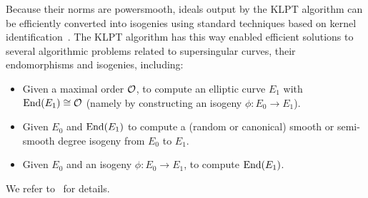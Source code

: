 Because their norms are powersmooth, ideals output by the KLPT algorithm can be efficiently converted into isogenies using standard techniques based on kernel identification~\cite{Waterhouse}. 
%
The KLPT algorithm has this way enabled efficient solutions to several algorithmic problems related to supersingular curves, their endomorphisms and isogenies, including:
\begin{itemize}
    \item Given a maximal order $\mathcal{O}$, to compute an elliptic curve $E_1$ with $\text{End}(E_1) \cong \mathcal{O}$ (namely by constructing an isogeny $\phi : E_0 \to E_1$).
    \item Given $E_0$ and $\text{End}(E_1)$ to compute a (random or canonical) smooth or semi-smooth degree isogeny from $E_0$ to $E_1$.
    \item Given $E_0$ and an isogeny $\phi : E_0 \to E_1$, to compute $\text{End}(E_1)$. 
\end{itemize}
We refer to~\cite{KLPT,GPS20,Reductions18,DFKLPW20,SQIsign2.0} for details.








